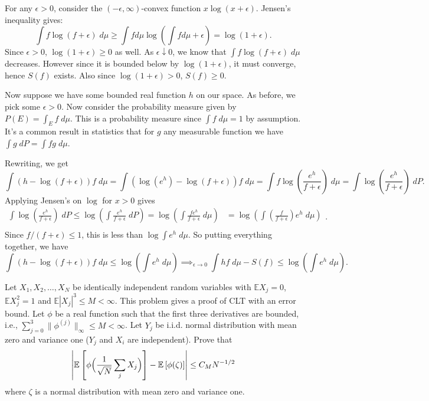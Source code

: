 \documentclass[11pt,letterpaper]{article}
\def\E{\mathbb{E}}
\begin{document}
\begin{solution}
    \quad For any $\epsilon>0$, consider the $(-\epsilon,\infty)$-convex function $x\log (x+\epsilon)$. Jensen's inequality gives:
    \[
    \int f\log (f+\epsilon)\;d\mu \geq \int fd\mu \log\left(\int fd\mu+\epsilon\right) = \log(1+\epsilon).
    \]
    Since $\epsilon > 0$, $\log(1+\epsilon)\geq 0$ as well. As $\epsilon\downarrow 0$, we know that $\int f\log(f+\epsilon)\;d\mu$ decreases. However since it is bounded below by $\log(1+\epsilon)$, it must converge, hence $S(f)$ exists. Also since $\log(1+\epsilon)>0$, $S(f)\geq 0$.    

    \quad Now suppose we have some bounded real function $h$ on our space. As before, we pick some $\epsilon>0$. Now consider the probability measure given by $P(E) = \int_E f\;d\mu.$ This is a probability measure since $\int f\;d\mu = 1$ by assumption. It's a common result in statistics that for $g$ any measurable function we have $\int g\;dP = \int fg\; d\mu$.

    Rewriting, we get
    \[
        \int \left(h -\log(f+\epsilon)\right)f\;d\mu = \int \left(\log(e^h)-\log(f+\epsilon)\right)f\;d\mu = \int f\log \left(\frac{e^h}{f+\epsilon}\right)\;d\mu = \int \log \left(\frac{e^h}{f+\epsilon}\right)\;dP
    .\]
    Applying Jensen's on $\log$ for $x>0$ gives
    \[
        \begin{aligned}
            \int \log \left(\frac{e^h}{f+\epsilon}\right)\;dP \leq \log\left(\int \frac{e^h}{f+\epsilon}\;dP\right)=\log \left(\int \frac{fe^h}{f+\epsilon}\;d\mu\right)&= \log\left(\int \left(\frac{f}{f+\epsilon}\right)e^h\;d\mu\right)\\
        \end{aligned}
    .\]
   Since $f / (f+\epsilon) \leq 1$, this is less than $\log \int e^h\;d\mu$. So putting everything together, we have
    \[
        \int (h-\log(f+\epsilon)) f\;d\mu \leq \log\left(\int e^h\;d\mu\right) \implies_{\epsilon \to 0} \int hf\;d\mu - S(f) \leq \log\left(\int e^h\;d\mu\right)
    .\] 
\end{solution}

\pagebreak
\begin{problem}
    Let $X_1,X_2,\ldots,X_N$ be identically independent random variables with $\E X_j = 0$, $\E X^2_j = 1$ and $\E|X_j|^3\leq M < \infty$. This problem gives a proof of CLT with an error bound. Let $\phi$ be a real function such that the first three derivatives are bounded, i.e., $\sum^3_{j=0} \|\phi^{(j)}\|_\infty \leq M < \infty$. Let $Y_j$ be i.i.d. normal distribution with mean zero and variance one ($Y_j$ and $X_i$ are independent).
    Prove that
    \[
        \left|\E\left[\phi\Bigl(\frac{1}{\sqrt{N}}\sum_j X_j\Bigr)\right] - \E\left[\phi(\zeta)\right]\right|\leq C_M N^{-1 /2}
    \]
    where $\zeta$ is a normal distribution with mean zero and variance one.
\end{problem}
\end{document}

